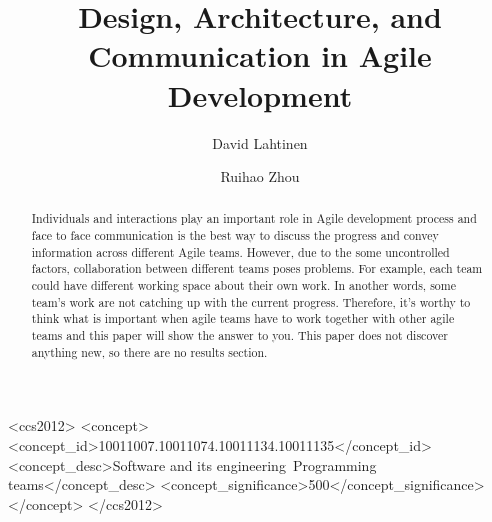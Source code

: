 \documentclass[sigplan,screen]{acmart}
\begin{document}
%
\title{Design, Architecture, and Communication in Agile Development}

%
\author{David Lahtinen}
\author{Ruihao Zhou}
\authornotemark[1]

%
\renewcommand{\shortauthors}{Trovato and Tobin, et al.}

%
\begin{abstract}
Individuals and interactions play an important role in Agile development process and face to face communication is the best way to discuss the progress and convey information across different Agile teams. However, due to the some uncontrolled factors, collaboration between different teams poses problems. For example, each team could have different working space about their own work. In another words, some team’s work are not catching up with the current progress. Therefore, it’s worthy to think what is important when agile teams have to work together with other agile teams and this paper will show the answer to you. This paper does not discover anything new, so there are no results section.
\end{abstract}

%
%
\begin{CCSXML}
<ccs2012>
  <concept>
    <concept_id>10011007.10011074.10011134.10011135</concept_id>
    <concept_desc>Software and its engineering~Programming teams</concept_desc>
    <concept_significance>500</concept_significance>
  </concept>
</ccs2012>
\end{CCSXML}

\end{document}
